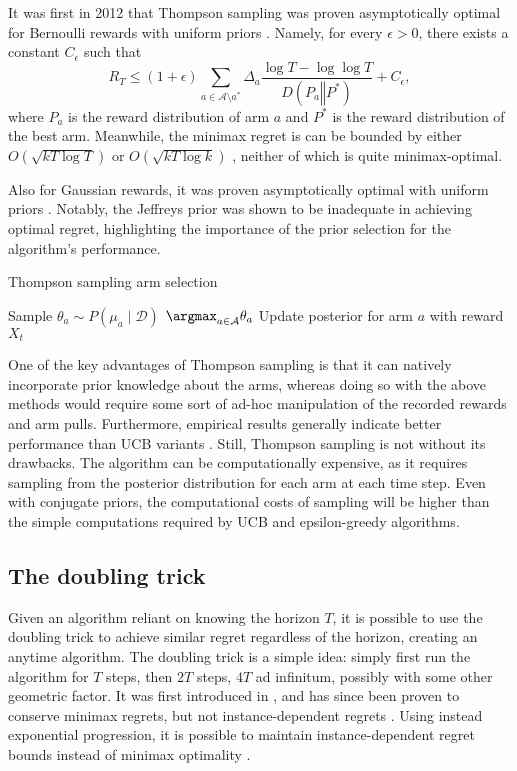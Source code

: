 It was first in 2012 that Thompson sampling was proven asymptotically optimal for Bernoulli rewards with uniform priors \autocite{kaufmann2012}.
Namely, for every $\epsilon > 0$, there exists a constant $C_\epsilon$ such that
\begin{equation}
    R_T
    \leq
    (1 + \epsilon)
    \sum_{a \in \mathcal{A} \setminus a^*}
    \Delta_a \frac{\log T - \log \log T}{D(P_a \mathrel{\Vert} P^*)}
    + C_\epsilon,
\end{equation}
where $P_a$ is the reward distribution of arm $a$ and $P^*$ is the reward distribution of the best arm.
Meanwhile, the minimax regret is can be bounded by either $O(\sqrt{kT \log T})$ \autocite{agrawal2013} or $O(\sqrt{kT \log k})$ \autocite{agrawal2017}, neither of which is quite minimax-optimal.

Also for Gaussian rewards, it was proven asymptotically optimal with uniform priors \autocite{honda2014}.
Notably, the Jeffreys prior was shown to be inadequate in achieving optimal regret, highlighting the importance of the prior selection for the algorithm's performance.

\begin{algorithm}
    \caption{Thompson sampling arm selection}
    \label{alg:thompson}
    \begin{algorithmic}
        \State Sample $\theta_a \sim P(\mu_a \mid \mathcal{D})$
        \EndFor
        \State \Return $\argmax_{a \in \mathcal{A}} \theta_a$
        \State Update posterior for arm $a$ with reward $X_t$
    \end{algorithmic}
\end{algorithm}

One of the key advantages of Thompson sampling is that it can natively incorporate prior knowledge about the arms, whereas doing so with the above methods would require some sort of ad-hoc manipulation of the recorded rewards and arm pulls.
Furthermore, empirical results generally indicate better performance than UCB variants \autocite{kaufmann2012}.
Still, Thompson sampling is not without its drawbacks.
The algorithm can be computationally expensive, as it requires sampling from the posterior distribution for each arm at each time step.
Even with conjugate priors, the computational costs of sampling will be higher than the simple computations required by UCB and epsilon-greedy algorithms.

\subsection{The doubling trick}
Given an algorithm reliant on knowing the horizon $T$, it is possible to use the doubling trick to achieve similar regret regardless of the horizon, creating an anytime algorithm.
The doubling trick is a simple idea: simply first run the algorithm for $T$ steps, then $2T$ steps, $4T$ ad infinitum, possibly with some other geometric factor.
It was first introduced in \autocite{auer1995}, and has since been proven to conserve minimax regrets, but not instance-dependent regrets \autocite{besson2018}.
Using instead exponential progression, it is possible to maintain instance-dependent regret bounds instead of minimax optimality \autocite{besson2018}.
